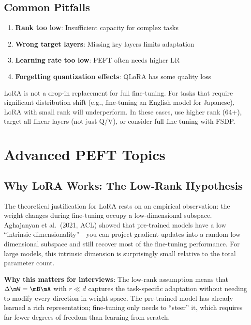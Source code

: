 \subsection{Common Pitfalls}

\begin{enumerate}
    \item \textbf{Rank too low}: Insufficient capacity for complex tasks
    \item \textbf{Wrong target layers}: Missing key layers limits adaptation
    \item \textbf{Learning rate too low}: PEFT often needs higher LR
    \item \textbf{Forgetting quantization effects}: QLoRA has some quality loss
\end{enumerate}

\begin{warningbox}
LoRA is not a drop-in replacement for full fine-tuning. For tasks that require significant distribution shift (e.g., fine-tuning an English model for Japanese), LoRA with small rank will underperform. In these cases, use higher rank (64+), target all linear layers (not just Q/V), or consider full fine-tuning with FSDP.
\end{warningbox}

\section{Advanced PEFT Topics}
\label{sec:peft_advanced}

\subsection{Why LoRA Works: The Low-Rank Hypothesis}

The theoretical justification for LoRA rests on an empirical observation: the weight changes during fine-tuning occupy a low-dimensional subspace. Aghajanyan et al.\ (2021, ACL) showed that pre-trained models have a low ``intrinsic dimensionality''---you can project gradient updates into a random low-dimensional subspace and still recover most of the fine-tuning performance. For large models, this intrinsic dimension is surprisingly small relative to the total parameter count.

\textbf{Why this matters for interviews}: The low-rank assumption means that $\Delta \mW = \mB \mA$ with $r \ll d$ captures the task-specific adaptation without needing to modify every direction in weight space. The pre-trained model has already learned a rich representation; fine-tuning only needs to ``steer'' it, which requires far fewer degrees of freedom than learning from scratch.

